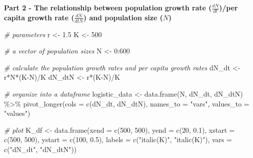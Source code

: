 \documentclass[
]{book}
\newenvironment{Shaded}{\begin{snugshade}}{\end{snugshade}}
\newcommand{\AttributeTok}[1]{\textcolor[rgb]{0.77,0.63,0.00}{#1}}
\newcommand{\CommentTok}[1]{\textcolor[rgb]{0.56,0.35,0.01}{\textit{#1}}}
\newcommand{\DecValTok}[1]{\textcolor[rgb]{0.00,0.00,0.81}{#1}}
\newcommand{\FloatTok}[1]{\textcolor[rgb]{0.00,0.00,0.81}{#1}}
\newcommand{\FunctionTok}[1]{\textcolor[rgb]{0.00,0.00,0.00}{#1}}
\newcommand{\NormalTok}[1]{#1}
\newcommand{\OtherTok}[1]{\textcolor[rgb]{0.56,0.35,0.01}{#1}}
\newcommand{\SpecialCharTok}[1]{\textcolor[rgb]{0.00,0.00,0.00}{#1}}
\newcommand{\StringTok}[1]{\textcolor[rgb]{0.31,0.60,0.02}{#1}}
\begin{document}
\textbf{Part 2 - The relationship between population growth rate (\(\frac{dN}{dt}\))/per capita growth rate (\(\frac{dN}{dtN}\)) and population size (\(N\))}

\begin{Shaded}
\begin{Highlighting}[]
\CommentTok{\# parameters}
\NormalTok{r }\OtherTok{\textless{}{-}} \FloatTok{1.5}
\NormalTok{K }\OtherTok{\textless{}{-}} \DecValTok{500}

\CommentTok{\# a vector of population sizes}
\NormalTok{N }\OtherTok{\textless{}{-}} \DecValTok{0}\SpecialCharTok{:}\DecValTok{600}

\CommentTok{\# calculate the population growth rates and per capita growth rates}
\NormalTok{dN\_dt }\OtherTok{\textless{}{-}}\NormalTok{ r}\SpecialCharTok{*}\NormalTok{N}\SpecialCharTok{*}\NormalTok{(K}\SpecialCharTok{{-}}\NormalTok{N)}\SpecialCharTok{/}\NormalTok{K }
\NormalTok{dN\_dtN }\OtherTok{\textless{}{-}}\NormalTok{ r}\SpecialCharTok{*}\NormalTok{(K}\SpecialCharTok{{-}}\NormalTok{N)}\SpecialCharTok{/}\NormalTok{K}

\CommentTok{\# organize into a dataframe}
\NormalTok{logistic\_data }\OtherTok{\textless{}{-}} \FunctionTok{data.frame}\NormalTok{(N, dN\_dt, dN\_dtN) }\SpecialCharTok{\%\textgreater{}\%}
  \FunctionTok{pivot\_longer}\NormalTok{(}\AttributeTok{cols =} \FunctionTok{c}\NormalTok{(dN\_dt, dN\_dtN), }
               \AttributeTok{names\_to =} \StringTok{"vars"}\NormalTok{, }
               \AttributeTok{values\_to =} \StringTok{"values"}\NormalTok{)}

\CommentTok{\# plot }
\NormalTok{K\_df }\OtherTok{\textless{}{-}} \FunctionTok{data.frame}\NormalTok{(}\AttributeTok{xend =} \FunctionTok{c}\NormalTok{(}\DecValTok{500}\NormalTok{, }\DecValTok{500}\NormalTok{),}
                   \AttributeTok{yend =} \FunctionTok{c}\NormalTok{(}\DecValTok{20}\NormalTok{, }\FloatTok{0.1}\NormalTok{),}
                   \AttributeTok{xstart =} \FunctionTok{c}\NormalTok{(}\DecValTok{500}\NormalTok{, }\DecValTok{500}\NormalTok{),}
                   \AttributeTok{ystart =} \FunctionTok{c}\NormalTok{(}\DecValTok{100}\NormalTok{, }\FloatTok{0.5}\NormalTok{),}
                   \AttributeTok{labels =} \FunctionTok{c}\NormalTok{(}\StringTok{"italic(K)"}\NormalTok{, }\StringTok{"italic(K)"}\NormalTok{),}
                   \AttributeTok{vars =} \FunctionTok{c}\NormalTok{(}\StringTok{"dN\_dt"}\NormalTok{, }\StringTok{"dN\_dtN"}\NormalTok{))}


\end{Highlighting}
\end{Shaded}
\end{document}
